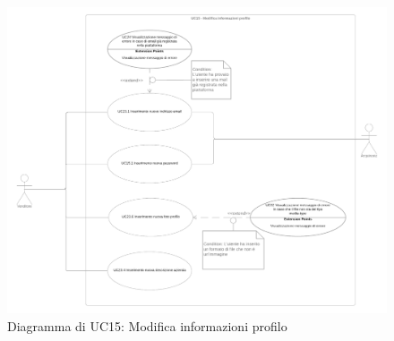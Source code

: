 \begin{figure}[H]
    \centering
    \includegraphics[width=\textwidth]{Immagini/DiagrammiUC/UC15ModificaInformazioniProfilo}
    \caption{Diagramma di UC15: Modifica informazioni profilo} 
    \label{fig:VisualizzazioneProdottiNelCarrello}
\end{figure}

